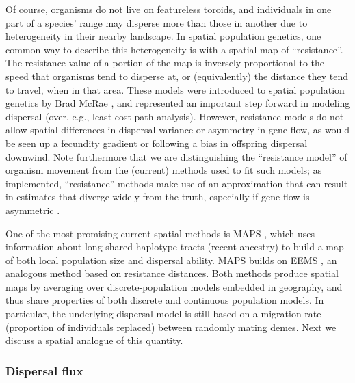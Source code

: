 \documentclass{ar-1col}
\begin{document}
Of course, organisms do not live on featureless toroids, 
and individuals in one part of a species' range may disperse more than those in another 
due to heterogeneity in their nearby landscape.
In spatial population genetics, one common way 
to describe this heterogeneity is with a spatial map of ``resistance''.
The resistance value of a portion of the map is inversely proportional to the speed
that organisms tend to disperse at, or (equivalently) the distance they tend to travel,
when in that area.
These models were introduced to spatial population genetics by Brad McRae \citep{McRae2006,McRae_Beier_2007,McRae2008}, 
and represented an important step forward in modeling dispersal 
(over, e.g., least-cost path analysis).
However, resistance models do not allow 
spatial differences in dispersal variance 
or asymmetry in gene flow,
as would be seen up a fecundity gradient or following a bias in offspring dispersal downwind.
Note furthermore that we are distinguishing the ``resistance model'' of organism movement
from the (current) methods used to fit such models;
as implemented, ``resistance'' methods make use of an approximation
that can result in estimates that diverge widely from the truth,
especially if gene flow is asymmetric \citep{lundgren2018populations}.

One of the most promising current spatial methods is MAPS \citep{alasadi2018estimating}, 
which uses information about long shared haplotype tracts (recent ancestry) 
to build a map of both local population size and dispersal ability.  
MAPS builds on EEMS \citep{petkova2016visualizing}, an analogous method 
based on resistance distances.
Both methods produce spatial maps by averaging over discrete-population models
embedded in geography,
and thus share properties of both discrete and continuous population models.
In particular, the underlying dispersal model is still based on 
a migration rate (proportion of individuals replaced) between randomly mating demes.
Next we discuss a spatial analogue of this quantity.


\subsubsection{Dispersal flux}
\end{document}
